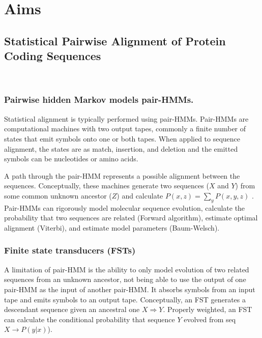 \section{Aims}

\subsection{Statistical Pairwise Alignment of Protein Coding Sequences}

\\
\subsubsection{Pairwise hidden Markov models pair-HMMs.}
Statistical alignment is typically performed using pair-HMMs.
Pair-HMMs are computational machines with two output tapes, commonly a finite
number of states that emit symbols onto one or both tapes.
When applied to sequence alignment, the states are  as match, insertion, and deletion and the emitted symbols can be
nucleotides or amino acids.

A path through the pair-HMM represents a possible alignment between the
sequences.
Conceptually, these machines generate two sequences ($X$ and $Y$) from some
common unknown ancestor ($Z$) and calculate $P(x,z) = \sum_y P(x,y,z)$
\parencite{yoon_2009_hmm}.
Pair-HMMs can rigorously model molecular sequence evolution, calculate the
probability that two sequences are related (Forward algorithm), estimate optimal
alignment (Viterbi), and estimate model parameters (Baum-Welsch).

\subsubsection{Finite state transducers (FSTs)}
A limitation of pair-HMM is the ability to only model evolution of two related
sequences from an unknown ancestor, not being able to use the output of one
pair-HMM as the input of another pair-HMM.
It absorbs symbols from an input tape and emits symbols to an output tape.
Conceptually, an FST generates a descendant sequence given an ancestral one
$X \Rightarrow Y$.
Properly weighted, an FST can calculate the conditional probability that
sequence $Y$ evolved from seq $X \rightarrow P(y|x)$).

